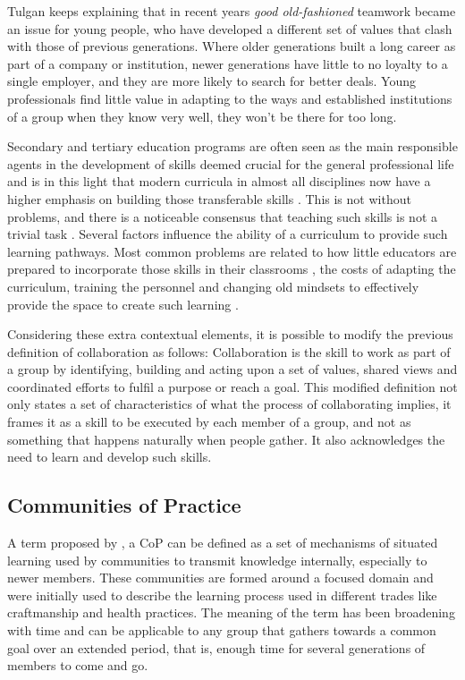 Tulgan keeps explaining that in recent years \emph{good old-fashioned} teamwork became an issue for young people, who have developed a different set of values that clash with those of previous generations. Where
older generations built a long career as part of a company or institution, newer generations have little to no loyalty to a single employer, and they are more likely to search for better deals. Young professionals
find little value in adapting to the ways and established institutions of a group when they know very well, they won't be there for too long.

Secondary and tertiary education programs are often seen as the main responsible agents in the development of skills deemed crucial for the general professional life \parencite{kechagias_2011} and is in this light
that modern curricula in almost all disciplines now have a higher emphasis on building those transferable skills \parencite{dhir_2021}. This is not without problems, and there is a noticeable consensus that teaching
such skills is not a trivial task \parencite{mccale_2008}. Several factors influence the ability of a curriculum to provide such learning pathways. Most common problems are related to how little educators are prepared
to incorporate those skills in their classrooms \parencite{kemp_1995}, the costs of adapting the curriculum, training the personnel and changing old mindsets to effectively provide the space to create such learning \parencite{chadha_2006}.

Considering these extra contextual elements, it is possible to modify the previous definition of collaboration as follows: Collaboration is the skill to work as part of a group by identifying, building and acting upon
a set of values, shared views and coordinated efforts to fulfil a purpose or reach a goal. This modified definition not only states a set of characteristics of what the process of collaborating implies, it frames it as
a skill to be executed by each member of a group, and not as something that happens naturally when people gather. It also acknowledges the need to learn and develop such skills.

\subsection{Communities of Practice \label{sec:2-1-2}}

A term proposed by \textcite{lave_1991}, a \ac{CoP} can be defined as a set of mechanisms of situated learning used by communities to transmit knowledge internally, especially to newer members. These communities are
formed around a focused domain and were initially used to describe the learning process used in different trades like craftmanship and health practices. The meaning of the term has been broadening with time and can
be applicable to any group that gathers towards a common goal over an extended period, that is, enough time for several generations of members to come and go.

